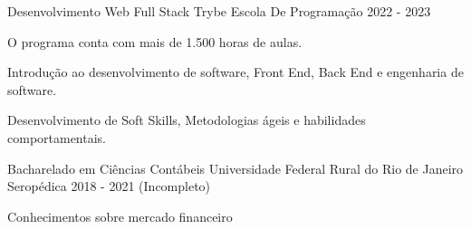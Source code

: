 

\begin{cventries}

\cventry
    {Desenvolvimento Web Full Stack} %
    {Trybe} %
    {Escola De Programação} %
    {2022 - 2023} %
    {
      \begin{cvitems} %
        \item {O programa conta com mais de 1.500 horas de aulas.}
      \item {Introdução ao desenvolvimento de software, Front End, Back End e engenharia de software.}
      \item {Desenvolvimento de Soft Skills, Metodologias ágeis e habilidades comportamentais.}
      \end{cvitems}
    }
   
   \cventry
    {Bacharelado em Ciências Contábeis} %
    {Universidade Federal Rural do Rio de Janeiro} %
    {Seropédica} %
    {2018 - 2021 (Incompleto)} %
    {
      \begin{cvitems} %
        \item{Conhecimentos sobre mercado financeiro}
      \end{cvitems}
    } 

\end{cventries}
